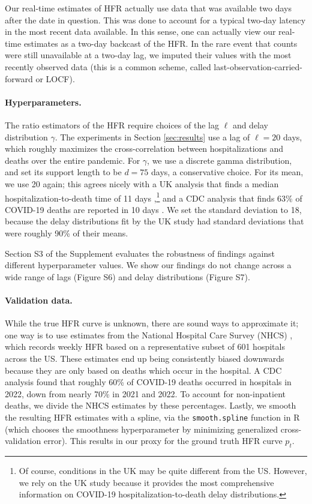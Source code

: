 \documentclass{article}
\begin{document}
Our real-time estimates of HFR actually use data that was available two days
after the date in question. This was done to account for a typical two-day
latency in the most recent data available. In this sense, one can actually view
our real-time estimates as a two-day backcast of the HFR. In the rare event that
counts were still unavailable at a two-day lag, we imputed their values with the
most recently observed data (this is a common scheme, called
last-observation-carried-forward or LOCF).        

\paragraph{Hyperparameters.}

The ratio estimators of the HFR require choices of the lag $\ell$ and delay
distribution $\gamma$. The experiments in Section \ref{sec:results} use a lag of
$\ell=20$ days, which roughly maximizes the cross-correlation between
hospitalizations and deaths over the entire pandemic. For $\gamma$, we use a
discrete gamma distribution, and set its support length to be $d=75$ days, a
conservative choice. For its mean, we use 20 again; this agrees nicely with a UK
analysis that finds a median hospitalization-to-death time of 11 days
\citep{UKdelay},\footnote{Of course, conditions in the UK may be quite different
  from the US. However, we rely on the UK study because it provides the most
  comprehensive information on COVID-19 hospitalization-to-death delay 
  distributions.}   
and a CDC analysis that finds 63\% of COVID-19 deaths are reported in 10 days   
\citep{cdc_deaths_demographic_geographic_2023}. We set the standard deviation to 
18, because the delay distributions fit by the UK study had standard deviations
that were roughly 90\% of their means. 

Section S3 of the Supplement evaluates
the robustness of findings against different hyperparameter values. 
We show our findings do not change across a wide range of lags (Figure S6) and delay distributions (Figure S7).

\paragraph{Validation data.}


While the true HFR curve is unknown, there are sound ways to approximate it; one  
way is to use estimates from the National Hospital Care Survey (NHCS)
\citep{NHCS2023}, which records weekly HFR based on a representative subset 
of 601 hospitals across the US. These estimates end up being consistently
biased downwards because they are only based on deaths which occur in the
hospital. A CDC analysis \citep{ahmad2023covid} found that roughly 60\% of
COVID-19 deaths occurred in hospitals in 2022, down from nearly 70\% in 2021 and
2022. To account for non-inpatient deaths, we divide the NHCS estimates by these
percentages. Lastly, we smooth the resulting HFR estimates with a spline, via
the \texttt{smooth.spline} function in R (which chooses the smoothness
hyperparameter by minimizing generalized cross-validation error). This results 
in our proxy for the ground truth HFR curve $p_t$.  
\end{document}
